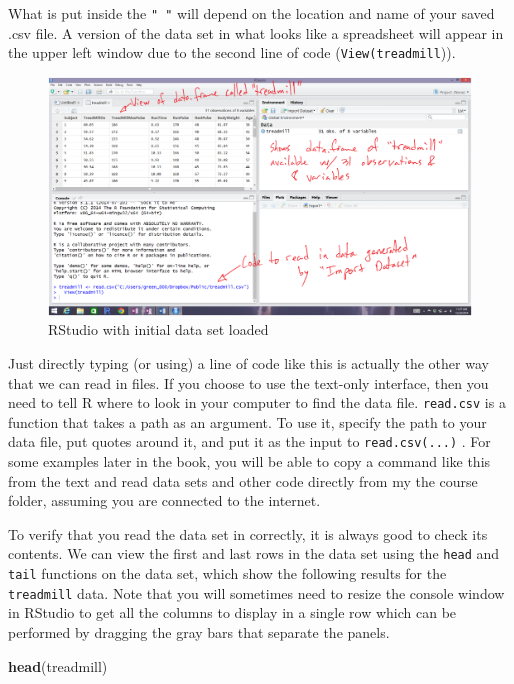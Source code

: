 \documentclass[]{book}
\newenvironment{Shaded}{\begin{snugshade}}{\end{snugshade}}
\newcommand{\KeywordTok}[1]{\textcolor[rgb]{0.13,0.29,0.53}{\textbf{{#1}}}}
\newcommand{\NormalTok}[1]{{#1}}
\begin{document}
What is put inside the \texttt{"\ "} will depend on the location and
name of your saved .csv file. A version of the data set in what looks
like a spreadsheet will appear in the upper left window due to the
second line of code (\texttt{View(treadmill})).



\begin{figure}
\includegraphics[width=14.72in]{chapter0_files/image005} \caption{RStudio with initial data set loaded}\label{fig:Figure3}
\end{figure}

Just directly typing (or using) a line of code like this is actually the
other way that we can read in files. If you choose to use the text-only
interface, then you need to tell R where to look in your computer to
find the data file. \texttt{read.csv} is a function that takes a path as
an argument. To use it, specify the path to your data file, put quotes
around it, and put it as the input to \texttt{read.csv(...)} . For some
examples later in the book, you will be able to copy a command like this
from the text and read data sets and other code directly from my the
course folder, assuming you are connected to the internet.

To verify that you read the data set in correctly, it is always good to
check its contents. We can view the first and last rows in the data set
using the \texttt{head} and \texttt{tail} functions on the data set,
which show the following results for the \texttt{treadmill} data. Note
that you will sometimes need to resize the console window in RStudio to
get all the columns to display in a single row which can be performed by
dragging the gray bars that separate the panels.

\begin{Shaded}
\begin{Highlighting}[]
\KeywordTok{head}\NormalTok{(treadmill)}
\end{Highlighting}
\end{Shaded}
\end{document}

